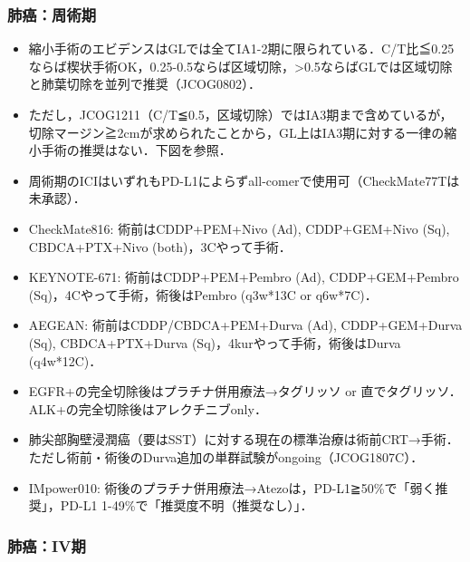 \subsubsection{肺癌：周術期}

\begin{itemize}
\item 縮小手術のエビデンスはGLでは全てIA1-2期に限られている．C/T比≦0.25ならば楔状手術OK，0.25-0.5ならば区域切除，>0.5ならばGLでは区域切除と肺葉切除を並列で推奨（JCOG0802）．
\item ただし，JCOG1211（C/T≦0.5，区域切除）ではIA3期まで含めているが，切除マージン≧2cmが求められたことから，GL上はIA3期に対する一律の縮小手術の推奨はない．下図を参照．


\item 周術期のICIはいずれもPD-L1によらずall-comerで使用可（CheckMate77Tは未承認）．
\item CheckMate816: 術前はCDDP+PEM+Nivo (Ad), CDDP+GEM+Nivo (Sq), CBDCA+PTX+Nivo (both)，3Cやって手術．
\item KEYNOTE-671: 術前はCDDP+PEM+Pembro (Ad), CDDP+GEM+Pembro (Sq)，4Cやって手術，術後はPembro (q3w*13C or q6w*7C)．
\item AEGEAN: 術前はCDDP/CBDCA+PEM+Durva (Ad), CDDP+GEM+Durva (Sq), CBDCA+PTX+Durva (Sq)，4kurやって手術，術後はDurva (q4w*12C)．
\item EGFR+の完全切除後はプラチナ併用療法→タグリッソ or 直でタグリッソ．ALK+の完全切除後はアレクチニブonly．
\item 肺尖部胸壁浸潤癌（要はSST）に対する現在の標準治療は術前CRT→手術．ただし術前・術後のDurva追加の単群試験がongoing（JCOG1807C）．
\item IMpower010: 術後のプラチナ併用療法→Atezoは，PD-L1≧50\%で「弱く推奨」，PD-L1 1-49\%で「推奨度不明（推奨なし）」．
\end{itemize}


\subsubsection{肺癌：IV期}

